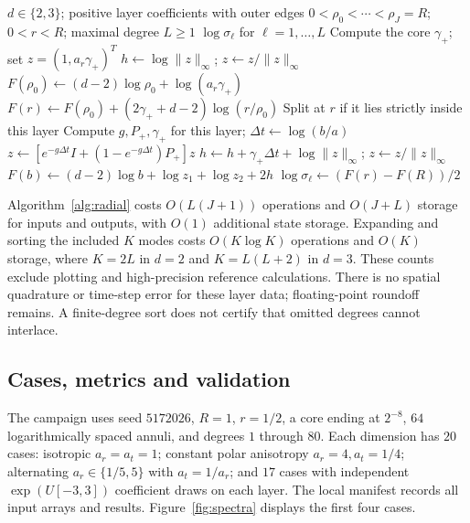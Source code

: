 \documentclass[11pt]{article}
\theoremstyle{remark}
\begin{document}
\begin{algorithm}[htbp]
\caption{Logarithmic energy ratios through radial layers}\label{alg:radial}
\begin{algorithmic}[1]
\Require $d\in\{2,3\}$; positive layer coefficients with outer edges
$0<\rho_0<\cdots<\rho_J=R$; $0<r<R$; maximal degree $L\ge1$
\Ensure $\log\sigma_\ell$ for $\ell=1,\ldots,L$
 \State Compute the core $\gamma_+$; set $z=(1,a_r\gamma_+)^T$
 \State $h\gets\log\|z\|_\infty$; $z\gets z/\|z\|_\infty$
 \State $F(\rho_0)\gets(d-2)\log\rho_0+\log(a_r\gamma_+)$
  \State $F(r)\gets F(\rho_0)+(2\gamma_++d-2)\log(r/\rho_0)$
 \EndIf
  \State Split at $r$ if it lies strictly inside this layer
   \State Compute $g,P_+,\gamma_+$ for this layer; $\Delta t\gets\log(b/a)$
   \State $z\gets[e^{-g\Delta t}I+(1-e^{-g\Delta t})P_+]z$
   \State $h\gets h+\gamma_+\Delta t+\log\|z\|_\infty$;
   $z\gets z/\|z\|_\infty$
   \State $F(b)\gets(d-2)\log b+\log z_1+\log z_2+2h$
  \EndFor
 \EndFor
 \State $\log\sigma_\ell\gets(F(r)-F(R))/2$
\EndFor
\end{algorithmic}
\end{algorithm}

Algorithm~\ref{alg:radial} costs $O(L(J+1))$ operations and $O(J+L)$
storage for inputs and outputs, with $O(1)$ additional state storage.
Expanding and sorting the included $K$ modes costs $O(K\log K)$ operations
and $O(K)$ storage, where $K=2L$ in $d=2$ and $K=L(L+2)$ in $d=3$.
These counts exclude plotting and high-precision reference calculations.
There is no spatial quadrature or time-step error for these layer data;
floating-point roundoff remains. A finite-degree sort does not certify
that omitted degrees cannot interlace.

\subsection{Cases, metrics and validation}
The campaign uses seed $5172026$, $R=1$, $r=1/2$, a core ending at
$2^{-8}$, $64$ logarithmically spaced annuli, and degrees $1$ through $80$.
Each dimension has $20$ cases: isotropic $a_r=a_t=1$; constant polar
anisotropy $a_r=4,a_t=1/4$; alternating $a_r\in\{1/5,5\}$ with
$a_t=1/a_r$; and $17$ cases with independent $\exp(U[-3,3])$ coefficient
draws on each layer. The local manifest records all input arrays and
results. Figure~\ref{fig:spectra} displays the first four cases.
\end{document}
